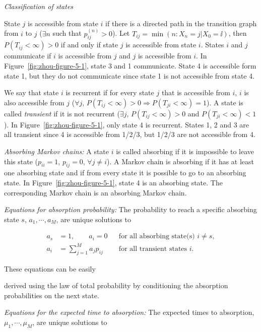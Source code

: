 \noindent\emph{Classification of states}

State $j$ is accessible from state $i$ if there is a directed path in the transition graph
from $i$ to $j$ ($\exists n$ such that $p^{(n)}_{ij}>0$). Let
$T_{ij}=\min(n:X_n=j\vert X_0=\ii)$, then $P(T_{ij}<\infty)>0$ if and only if state $j$
is accessible from state $i$. States $i$ and $j$ communicate if $i$ is accessible from $j$
and $j$ is accessible from $i$. In Figure~\ref{fig:zhou-figure-5-1}, state 3 and 1 communicate.
State 4 is accessible form state 1, but they do not communicate since state 1 is not
accessible from state 4.

We say that state $i$ is recurrent if for every state $j$ that is accessible from $i$, $i$
is also accessible from $j$ ($\forall j$, $P(T_{ij}<\infty)>0\Rightarrow
P(T_{ji}<\infty)=1$). A state is called \emph{transient} if it is not recurrent
($\exists j$, $P(T_{ij}<\infty)>0$ and $P(T_{ji}<\infty)<1$). In Figure~\ref{fig:zhou-figure-5-1},
only state 4 is recurrent. States 1, 2 and 3 are all transient since 4 is accessible from
1/2/3, but 1/2/3 are not accessible from 4.

\noindent\emph{Absorbing Markov chains:} A state $i$ is called absorbing if it is
impossible to leave this state ($p_{ii}=1$, $p_{ij}=0$, $\forall j\ne i$). A Markov chain
is absorbing if it has at least one absorbing state and if from every state it is possible
to go to an absorbing state. In Figure~\ref{fig:zhou-figure-5-1}, state 4 is an absorbing
state. The corresponding Markov chain is an absorbing Markov chain.

\noindent\emph{Equations for absorption probability:} The probability to reach a
specific absorbing state $s$, $a_1,\cdots,a_M$, are unique solutions to

\[
\begin{aligned}
a_s&=1,\qquad a_i=0 &&\text{for all absorbing state(s) }i\ne s,\\
a_i&=\sum_{j=1}^{M}a_jp_{ij} &&\text{for all transient states }i.
\end{aligned}
\]

These equations can be easily


derived using the law of total probability by conditioning the absorption probabilities on
the next state.

\noindent\emph{Equations for the expected time to absorption:} The expected times to
absorption, $\mu_1,\cdots,\mu_M$, are unique solutions to

